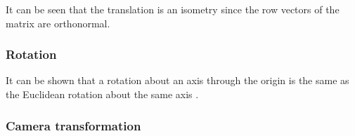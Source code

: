 It can be seen that the translation is an isometry since the row vectors of the matrix are orthonormal.

\subsubsection{Rotation}
It can be shown that a rotation about an axis through the origin is the same as the Euclidean rotation about the same axis \cite{Philips-Mark-Gunn1992}.

\subsubsection{Camera transformation}

